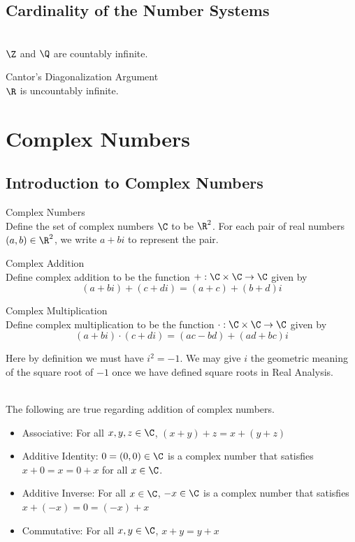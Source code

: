 \documentclass[a4paper]{article}
\begin{document}
\subsection{Cardinality of the Number Systems}
\begin{prp}{}{}\\
$\Z$ and $\Q$ are countably infinite. 
\end{prp}

\begin{thm}{Cantor's Diagonalization Argument}{}\\
$\R$ is uncountably infinite. 
\end{thm}

\pagebreak
\section{Complex Numbers}
\subsection{Introduction to Complex Numbers}
\begin{defn}{Complex Numbers}{}\\
Define the set of complex numbers $\C$ to be $\R^2$. For each pair of real numbers $(a,b)\in\R^2$, we write $a+bi$ to represent the pair. 
\end{defn}

\begin{defn}{Complex Addition}{}\\
Define complex addition to be the function $+:\C\times\C\to\C$ given by $$(a+bi)+(c+di)=(a+c)+(b+d)i$$
\end{defn}

\begin{defn}{Complex Multiplication}{}\\
Define complex multiplication to be the function $\cdot:\C\times\C\to\C$ given by $$(a+bi)\cdot(c+di)=(ac-bd)+(ad+bc)i$$
\end{defn}

Here by definition we must have $i^2=-1$. We may give $i$ the geometric meaning of the square root of $-1$ once we have defined square roots in Real Analysis. 

\begin{prp}{}{}\\
The following are true regarding addition of complex numbers. 
\begin{itemize}
\item Associative: For all $x,y,z\in\C$, $(x+y)+z=x+(y+z)$
\item Additive Identity: $0=(0,0)\in\C$ is a complex number that satisfies $x+0=x=0+x$ for all $x\in\C$. 
\item Additive Inverse: For all $x\in\C$, $-x\in\C$ is a complex number that satisfies $x+(-x)=0=(-x)+x$
\item Commutative: For all $x,y\in\C$, $x+y=y+x$
\end{itemize}
\end{prp}
\end{document}
